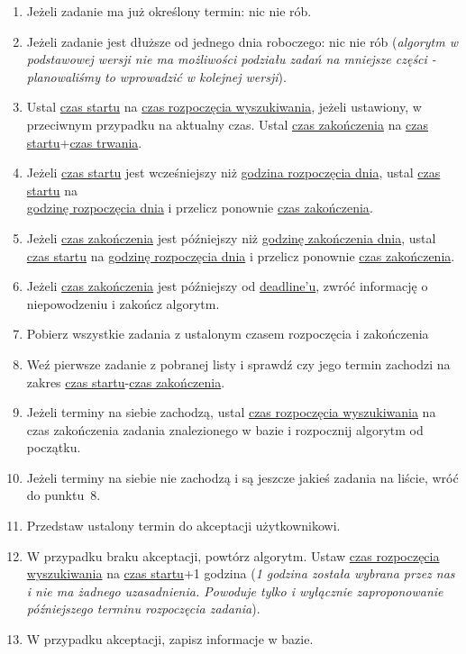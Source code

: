 \documentclass[pdflatex,11pt]{aghdpl}
\begin{document}
\begin{enumerate}
\item Jeżeli zadanie ma już określony termin: nic nie rób.
\item Jeżeli zadanie jest dłuższe od jednego dnia roboczego: nic nie rób (\textit{algorytm w podstawowej wersji nie ma możliwości podziału zadań na mniejsze części - planowaliśmy to wprowadzić w kolejnej wersji}).
\item Ustal \underline{czas startu} na \underline{czas rozpoczęcia wyszukiwania}, jeżeli ustawiony, w przeciwnym przypadku na aktualny czas. Ustal \underline{czas zakończenia} na \underline{czas startu}+\underline{czas trwania}.
\item Jeżeli \underline{czas startu} jest wcześniejszy niż \underline{godzina rozpoczęcia dnia}, ustal \underline{czas startu} na\\ \underline{godzinę rozpoczęcia dnia} i przelicz ponownie \underline{czas zakończenia}.
\item Jeżeli \underline{czas zakończenia} jest późniejszy niż \underline{godzinę zakończenia dnia}, ustal \underline{czas startu} na \underline{godzinę rozpoczęcia dnia} i przelicz ponownie \underline{czas zakończenia}.
\item Jeżeli \underline{czas zakończenia} jest późniejszy od \underline{deadline'u}, zwróć informację o niepowodzeniu i zakończ algorytm.
\item Pobierz wszystkie zadania z ustalonym czasem rozpoczęcia i zakończenia
\item Weź pierwsze zadanie z pobranej listy i sprawdź czy jego termin zachodzi na zakres \underline{czas startu}-\underline{czas zakończenia}.
\item Jeżeli terminy na siebie zachodzą, ustal \underline{czas rozpoczęcia wyszukiwania} na czas zakończenia zadania znalezionego w bazie i rozpocznij algorytm od początku.
\item Jeżeli terminy na siebie nie zachodzą i są jeszcze jakieś zadania na liście, wróć do punktu~8.
\item Przedstaw ustalony termin do akceptacji użytkownikowi.
\item W przypadku braku akceptacji, powtórz algorytm. Ustaw \underline{czas rozpoczęcia wyszukiwania} na \underline{czas startu}+1 godzina (\textit{1 godzina została wybrana przez nas i nie ma żadnego uzasadnienia. Powoduje tylko i wyłącznie zaproponowanie późniejszego terminu rozpoczęcia zadania}).
\item W przypadku akceptacji, zapisz informacje w bazie.
\end{enumerate}
\end{document}
